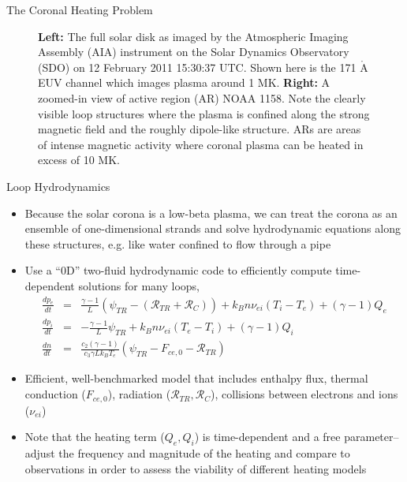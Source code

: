\documentclass[final]{beamer}
\begin{document}
\begin{frame}
\begin{columns}[T]
\begin{column}{0.49\linewidth}
\begin{block}{The Coronal Heating Problem}
\begin{figure}
\begin{columns}
                \caption{\textbf{Left:} The full solar disk as imaged by the Atmospheric Imaging Assembly (AIA) instrument on the Solar Dynamics Observatory (SDO) on 12 February 2011 15:30:37 UTC. Shown here is the 171 $\mathrm{\mathring{A}}$ EUV channel which images plasma around 1 MK. \textbf{Right:} A zoomed-in view of active region (AR) NOAA 1158. Note the clearly visible loop structures where the plasma is confined along the strong magnetic field and the roughly dipole-like structure. ARs are areas of intense magnetic activity where coronal plasma can be heated in excess of 10 MK.}
            \end{columns}
        \end{figure}
    \end{block}
    \begin{block}{Loop Hydrodynamics}
    \begin{itemize}
        \item Because the solar corona is a \alert{low-beta} plasma, we can treat the corona as an ensemble of one-dimensional strands and solve hydrodynamic equations along these structures, e.g. like water confined to flow through a pipe 
        \item Use a ``0D'' two-fluid hydrodynamic code \citep{klimchuk_highly_2008,cargill_enthalpy-based_2012,barnes_inference_2016} to efficiently compute time-dependent solutions for \alert{many} loops,
        \begin{eqnarray}
            \frac{dp_e}{dt} &=& \frac{\gamma - 1}{L}(\psi_{TR} - (\mathcal{R}_{TR} + \mathcal{R}_C)) + k_Bn\nu_{ei}(T_i - T_e) + (\gamma - 1)Q_e \\
            \frac{dp_i}{dt} &=& -\frac{\gamma - 1}{L}\psi_{TR} + k_Bn\nu_{ei}(T_e - T_i) + (\gamma - 1)Q_i \\
            \frac{dn}{dt} &=& \frac{c_2(\gamma - 1)}{c_3\gamma Lk_BT_e}(\psi_{TR} - F_{ce,0} - \mathcal{R}_{TR})
        \end{eqnarray}
        \item Efficient, well-benchmarked model \citep[see][]{cargill_enthalpy-based_2012-1,barnes_inference_2016} that includes enthalpy flux, thermal conduction ($F_{ce,0}$), radiation ($\mathcal{R}_{TR},\mathcal{R}_C$), collisions between electrons and ions ($\nu_{ei}$)
        \item Note that the heating term ($Q_e,Q_i$) is time-dependent and a \alert{free parameter}--adjust the frequency and magnitude of the heating and compare to observations in order to assess the viability of different heating models

\end{itemize}
\end{block}
\end{column}
\end{columns}
\end{frame}
\end{document}
